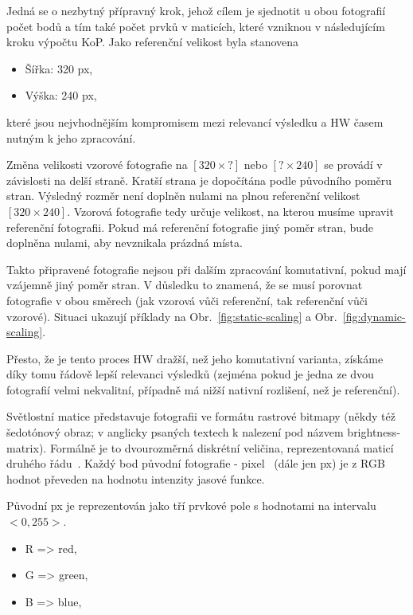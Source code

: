 Jedná se o nezbytný přípravný krok, jehož cílem je sjednotit u obou fotografií počet bodů a tím také počet prvků v maticích, které vzniknou v následujícím kroku výpočtu KoP.
Jako referenční velikost byla stanovena
\begin{itemize}
	\setlength{\parskip}{0pt}
	\setlength{\itemsep}{0pt}
	\item Šířka: 320 px,
	\item Výška: 240 px,
\end{itemize}
které jsou nejvhodnějším kompromisem mezi relevancí výsledku a HW časem nutným k jeho zpracování.

Změna velikosti vzorové fotografie na $ [320 × ?] $ nebo $ [? × 240] $ se provádí v závislosti na delší straně. Kratší strana je dopočítána podle původního poměru stran. Výsledný rozměr není doplněn nulami na plnou referenční velikost $ [320 × 240] $. Vzorová fotografie tedy určuje velikost, na kterou musíme upravit referenční fotografii. Pokud má referenční fotografie jiný poměr stran, bude doplněna nulami, aby nevznikala prázdná místa.

Takto připravené fotografie nejsou při dalším zpracování komutativní, pokud mají vzájemně jiný poměr stran. V důsledku to znamená, že se musí porovnat fotografie v obou směrech (jak vzorová vůči referenční, tak referenční vůči vzorové). Situaci ukazují příklady na Obr.~\ref{fig:static-scaling} a Obr.~\ref{fig:dynamic-scaling}.



Přesto, že je tento proces HW dražší, než jeho komutativní varianta, získáme díky tomu řádově lepší relevanci výsledků (zejména pokud je jedna ze dvou fotografií velmi nekvalitní, případně má nižší nativní rozlišení, než je referenční).

Světlostní matice představuje fotografii ve formátu rastrové bitmapy (někdy též šedotónový obraz; v anglicky psaných textech k nalezení pod názvem brightness-matrix). Formálně je to dvourozměrná diskrétní veličina, reprezentovaná maticí druhého řádu~\cite{brightness-matrix}. Každý bod původní fotografie - pixel~\cite{pixel} (dále jen px) je z RGB~\cite{rgb} hodnot převeden na hodnotu intenzity jasové funkce.

Původní px je reprezentován jako tří prvkové pole s hodnotami na intervalu $ <0,255> $.
\begin{itemize}
	\setlength{\parskip}{0pt}
	\setlength{\itemsep}{0pt}
	\item R => red,
	\item G => green,
	\item B => blue,
\end{itemize}

